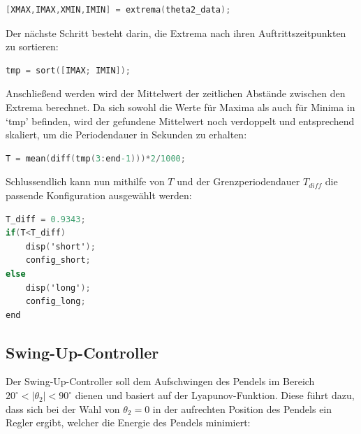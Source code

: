 \begin{lstlisting}[language=C] 
[XMAX,IMAX,XMIN,IMIN] = extrema(theta2_data); 
\end{lstlisting}
\vspace{1em}

Der nächste Schritt besteht darin, die Extrema nach ihren Auftrittszeitpunkten zu sortieren: \\


\begin{lstlisting}[language=C] 
tmp = sort([IMAX; IMIN]); 
\end{lstlisting}
\vspace{1em}

Anschließend werden wird der Mittelwert der zeitlichen Abstände zwischen den Extrema berechnet. Da sich sowohl die Werte für Maxima als auch für Minima  in `tmp' befinden, wird der gefundene Mittelwert noch verdoppelt und entsprechend skaliert, um die Periodendauer in Sekunden zu erhalten: \\

\begin{lstlisting}[language=C] 
T = mean(diff(tmp(3:end-1)))*2/1000; 
\end{lstlisting}
\vspace{1em}

Schlussendlich kann nun mithilfe von $T$ und der Grenzperiodendauer $T_{diff}$ die passende Konfiguration ausgewählt werden: \\

\begin{lstlisting}[language=C] 
T_diff = 0.9343;
if(T<T_diff)
    disp('short');
    config_short;
else
    disp('long');
    config_long;
end
\end{lstlisting}
\vspace{1em}



\subsection{Swing-Up-Controller}
\label{Swing-Up-Controller} 

Der Swing-Up-Controller soll dem Aufschwingen des Pendels im Bereich $20^\circ < \left| \theta_2 \right| < 90^\circ$ dienen und basiert auf der Lyapunov-Funktion. Diese führt dazu, dass sich bei der Wahl von
$ \theta_2 = 0$ in der aufrechten Position des Pendels ein Regler ergibt, welcher die Energie des Pendels minimiert:

